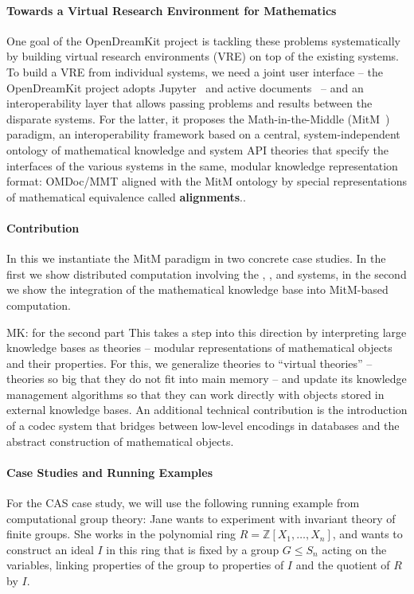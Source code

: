\paragraph{Towards a Virtual Research Environment for Mathematics} One goal of the OpenDreamKit project is tackling these problems systematically by building virtual research environments (VRE) on top of the existing systems.  To build a VRE from individual systems, we need a joint user interface -- the OpenDreamKit project adopts Jupyter~\cite{jupyter-project:on} and active documents~\cite{KohDavGin:psewads11} -- and an interoperability layer that allows passing problems and results between the disparate systems.  For the latter, it proposes the Math-in-the-Middle (MitM~\cite{DehKohKon:iop16}) paradigm, an interoperability framework based on a central, system-independent ontology of mathematical knowledge and system API theories that specify the interfaces of the various systems in the same, modular knowledge representation format: OMDoc/MMT aligned with the MitM ontology by special representations of mathematical equivalence called \textbf{alignments}..

\paragraph{Contribution}
In this \papertype we instantiate the MitM paradigm in two concrete case studies. In the first we show distributed computation involving the \GAP, \Sage, and \Singular systems, in the second we show the integration of the mathematical knowledge base \LMFDB into MitM-based computation.

\begin{newpart}{MK: for the second part}
    This \papertype takes a step into this direction by interpreting large knowledge bases as \ommt theories -- modular representations of mathematical objects and their properties. 
  For this, we generalize \ommt theories to ``virtual theories'' -- theories so big that they do not fit into main memory -- and update its knowledge management algorithms so that they can work directly with objects stored in external knowledge bases.
  An additional technical contribution is the introduction of a codec system that bridges between low-level encodings in databases and the abstract construction of mathematical objects.
\end{newpart}

\paragraph{Case Studies and Running Examples}
For the CAS case study, we will use the following running example from computational group theory: Jane wants to experiment with invariant theory of finite groups.
She works in the polynomial ring $R=\mathbb{Z}[X_1,\ldots,X_n]$, and wants to construct an ideal $I$ in this ring that is fixed by a group $G \leq S_n$ acting on the variables, linking properties of the group to properties of $I$ and the quotient of $R$ by $I$.

